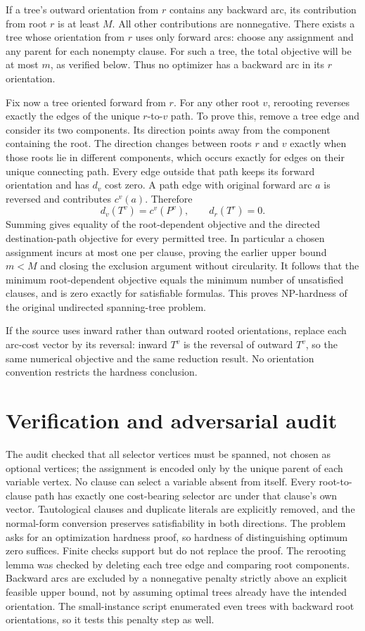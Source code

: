 \documentclass[11pt]{article}
\begin{document}
If a tree's outward orientation from $r$ contains any backward arc, its contribution from root $r$ is at least $M$. All other contributions are nonnegative. There exists a tree whose orientation from $r$ uses only forward arcs: choose any assignment and any parent for each nonempty clause. For such a tree, the total objective will be at most $m$, as verified below. Thus no optimizer has a backward arc in its $r$ orientation.

Fix now a tree oriented forward from $r$. For any other root $v$, rerooting reverses exactly the edges of the unique $r$-to-$v$ path. To prove this, remove a tree edge and consider its two components. Its direction points away from the component containing the root. The direction changes between roots $r$ and $v$ exactly when those roots lie in different components, which occurs exactly for edges on their unique connecting path. Every edge outside that path keeps its forward orientation and has $d_v$ cost zero. A path edge with original forward arc $a$ is reversed and contributes $c^v(a)$. Therefore
\[
d_v(T^v)=c^v(P^v),\qquad d_r(T^r)=0.
\]
Summing gives equality of the root-dependent objective and the directed destination-path objective for every permitted tree. In particular a chosen assignment incurs at most one per clause, proving the earlier upper bound $m<M$ and closing the exclusion argument without circularity. It follows that the minimum root-dependent objective equals the minimum number of unsatisfied clauses, and is zero exactly for satisfiable formulas. This proves NP-hardness of the original undirected spanning-tree problem.

If the source uses inward rather than outward rooted orientations, replace each arc-cost vector by its reversal: inward $T^v$ is the reversal of outward $T^v$, so the same numerical objective and the same reduction result. No orientation convention restricts the hardness conclusion.

\section{Verification and adversarial audit}
The audit checked that all selector vertices must be spanned, not chosen as optional vertices; the assignment is encoded only by the unique parent of each variable vertex. No clause can select a variable absent from itself. Every root-to-clause path has exactly one cost-bearing selector arc under that clause's own vector. Tautological clauses and duplicate literals are explicitly removed, and the normal-form conversion preserves satisfiability in both directions. The problem asks for an optimization hardness proof, so hardness of distinguishing optimum zero suffices. Finite checks support but do not replace the proof. The rerooting lemma was checked by deleting each tree edge and comparing root components. Backward arcs are excluded by a nonnegative penalty strictly above an explicit feasible upper bound, not by assuming optimal trees already have the intended orientation. The small-instance script enumerated even trees with backward root orientations, so it tests this penalty step as well.
\end{document}
